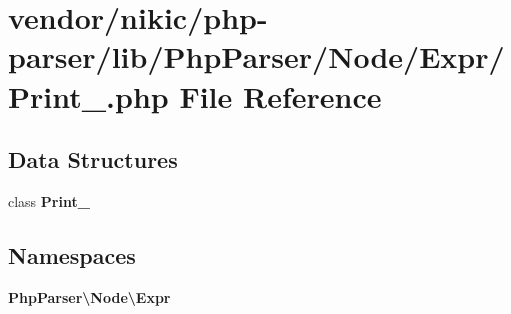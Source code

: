 \section{vendor/nikic/php-\/parser/lib/\+Php\+Parser/\+Node/\+Expr/\+Print\+\_\+.php File Reference}
\label{_print___8php}
\subsection*{Data Structures}
\begin{DoxyCompactItemize}
\item 
class {\bf Print\+\_\+}
\end{DoxyCompactItemize}
\subsection*{Namespaces}
\begin{DoxyCompactItemize}
\item 
 {\bf Php\+Parser\textbackslash{}\+Node\textbackslash{}\+Expr}
\end{DoxyCompactItemize}
